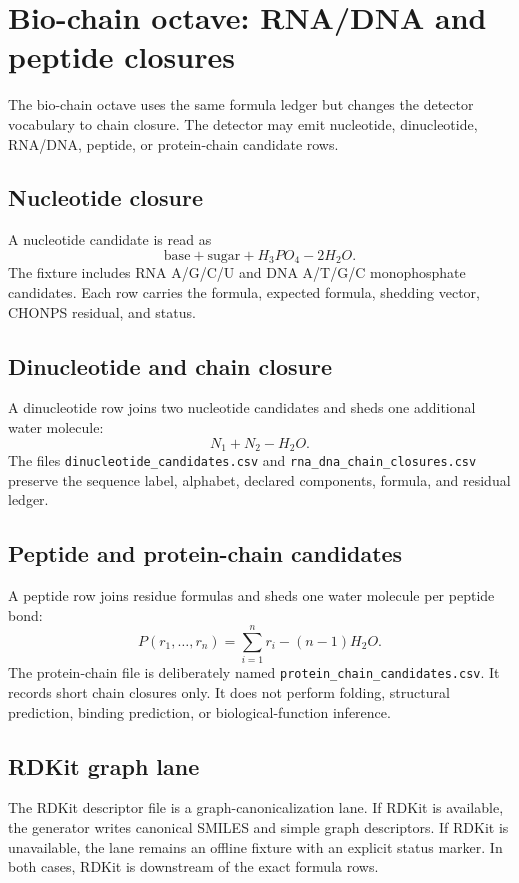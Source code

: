 \section{Bio-chain octave: RNA/DNA and peptide closures}

The bio-chain octave uses the same formula ledger but changes the detector vocabulary to chain closure. The detector may emit nucleotide, dinucleotide, RNA/DNA, peptide, or protein-chain candidate rows.

\subsection{Nucleotide closure}

A nucleotide candidate is read as
\[
\text{base} + \text{sugar} + H_3PO_4 - 2H_2O.
\]
The fixture includes RNA A/G/C/U and DNA A/T/G/C monophosphate candidates. Each row carries the formula, expected formula, shedding vector, CHONPS residual, and status.

\subsection{Dinucleotide and chain closure}

A dinucleotide row joins two nucleotide candidates and sheds one additional water molecule:
\[
N_1+N_2-H_2O.
\]
The files \texttt{dinucleotide\_candidates.csv} and \texttt{rna\_dna\_chain\_closures.csv} preserve the sequence label, alphabet, declared components, formula, and residual ledger.

\subsection{Peptide and protein-chain candidates}

A peptide row joins residue formulas and sheds one water molecule per peptide bond:
\[
P(r_1,\ldots,r_n)=\sum_{i=1}^{n}r_i-(n-1)H_2O.
\]
The protein-chain file is deliberately named \texttt{protein\_chain\_candidates.csv}. It records short chain closures only. It does not perform folding, structural prediction, binding prediction, or biological-function inference.

\subsection{RDKit graph lane}

The RDKit descriptor file is a graph-canonicalization lane. If RDKit is available, the generator writes canonical SMILES and simple graph descriptors. If RDKit is unavailable, the lane remains an offline fixture with an explicit status marker. In both cases, RDKit is downstream of the exact formula rows.

